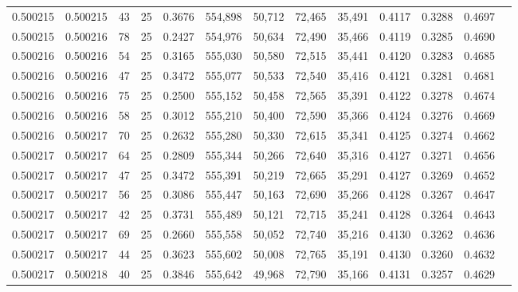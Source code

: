 \begin{tabular}{rrrrrrrrrrrrr}
0.500215 & 0.500215 &    43 &  25 &                                     0.3676 & 554,898 &  50,712 &  72,465 &  35,491 & 0.4117 & 0.3288 & 0.4697 \\
0.500215 & 0.500216 &    78 &  25 &                                     0.2427 & 554,976 &  50,634 &  72,490 &  35,466 & 0.4119 & 0.3285 & 0.4690 \\
0.500216 & 0.500216 &    54 &  25 &                                     0.3165 & 555,030 &  50,580 &  72,515 &  35,441 & 0.4120 & 0.3283 & 0.4685 \\
0.500216 & 0.500216 &    47 &  25 &                                     0.3472 & 555,077 &  50,533 &  72,540 &  35,416 & 0.4121 & 0.3281 & 0.4681 \\
0.500216 & 0.500216 &    75 &  25 &                                     0.2500 & 555,152 &  50,458 &  72,565 &  35,391 & 0.4122 & 0.3278 & 0.4674 \\
0.500216 & 0.500216 &    58 &  25 &                                     0.3012 & 555,210 &  50,400 &  72,590 &  35,366 & 0.4124 & 0.3276 & 0.4669 \\
0.500216 & 0.500217 &    70 &  25 &                                     0.2632 & 555,280 &  50,330 &  72,615 &  35,341 & 0.4125 & 0.3274 & 0.4662 \\
0.500217 & 0.500217 &    64 &  25 &                                     0.2809 & 555,344 &  50,266 &  72,640 &  35,316 & 0.4127 & 0.3271 & 0.4656 \\
0.500217 & 0.500217 &    47 &  25 &                                     0.3472 & 555,391 &  50,219 &  72,665 &  35,291 & 0.4127 & 0.3269 & 0.4652 \\
0.500217 & 0.500217 &    56 &  25 &                                     0.3086 & 555,447 &  50,163 &  72,690 &  35,266 & 0.4128 & 0.3267 & 0.4647 \\
0.500217 & 0.500217 &    42 &  25 &                                     0.3731 & 555,489 &  50,121 &  72,715 &  35,241 & 0.4128 & 0.3264 & 0.4643 \\
0.500217 & 0.500217 &    69 &  25 &                                     0.2660 & 555,558 &  50,052 &  72,740 &  35,216 & 0.4130 & 0.3262 & 0.4636 \\
0.500217 & 0.500217 &    44 &  25 &                                     0.3623 & 555,602 &  50,008 &  72,765 &  35,191 & 0.4130 & 0.3260 & 0.4632 \\
0.500217 & 0.500218 &    40 &  25 &                                     0.3846 & 555,642 &  49,968 &  72,790 &  35,166 & 0.4131 & 0.3257 & 0.4629 \\

\end{tabular}

